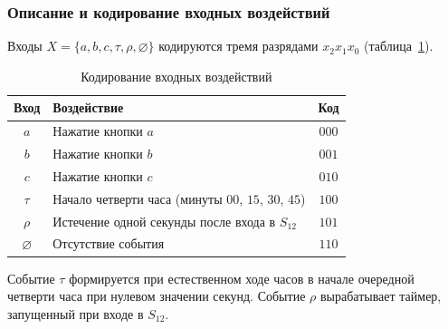\subsubsection{Описание и кодирование входных воздействий}
\label{sec:inputs}

Входы $X = \{a,b,c,\tau,\rho,\varnothing\}$ кодируются тремя разрядами $x_2x_1x_0$ (таблица~\ref{tab:inputs}).

\begin{table}[H]
	\centering
	\caption{Кодирование входных воздействий}
	\label{tab:inputs}
	\small{}
	\renewcommand{\arraystretch}{1.12}
	\begin{tabularx}{\textwidth}{|c|>{\raggedright\arraybackslash}X|c|}
		\hline
		Вход & Воздействие & Код \\
		\hline
		$a$ & Нажатие кнопки $a$ & $000$ \\
		$b$ & Нажатие кнопки $b$ & $001$ \\
		$c$ & Нажатие кнопки $c$ & $010$ \\
		$\tau$ & Начало четверти часа (минуты $00$, $15$, $30$, $45$) & $100$ \\
		$\rho$ & Истечение одной секунды после входа в $S_{12}$ & $101$ \\
		$\varnothing$ & Отсутствие события & $110$ \\
		\hline
	\end{tabularx}
\end{table}

Событие $\tau$ формируется при естественном ходе часов в начале очередной четверти часа при нулевом значении секунд. Событие $\rho$ вырабатывает таймер, запущенный при входе в $S_{12}$.
